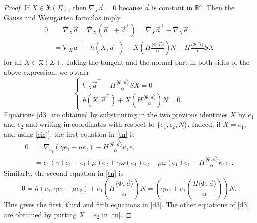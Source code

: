 \documentclass[10pt,a4paper]{amsart}
\def\r{\mathbb R}
\begin{document}
\begin{proof} 
 If $X\in\mathfrak{X}(\Sigma)$, then   $\overline{\nabla}_X\vec{a}=0$ because $\vec{a}$ is constant in $\r^3$. Then the Gauss and
Weingarten formulas imply 
\begin{equation*}
\begin{split}
    0&=\overline{\nabla}_{X}\vec{a}=\overline{\nabla}_{X}(\vec{a}^{\top}+\vec{a}^{\perp})=\overline{\nabla}_X\vec{a}^\top+\overline{\nabla}_X\vec{a}^\perp\\
    &={\nabla}_{X}\vec{a}^{\top}+h(X,\vec{a}^{\top})+X( H\frac{\langle\Phi,\vec{a}\rangle}{\alpha})N- H\frac{\langle \Phi,\vec{a}\rangle}{\alpha} SX 
\end{split}
\end{equation*}
for all   $X\in\mathfrak{X}(\Sigma)$.
Taking the tangent and the normal part in both sides of the above expression, we obtain  
\begin{equation}\label{tn} 
    \left\{
    \begin{array}{ll}
        {\nabla}_{X}\vec{a}^{\top}-H\frac{\langle\Phi,\vec{a}\rangle}{\alpha}SX=0\\
        h(X, \vec{a}^{\top})+X(H\frac{\langle\Phi,\vec{a}\rangle}{\alpha})N=0.
    \end{array}
    \right.
\end{equation}
Equations \eqref{d3} are obtained by substituting  in the two previous identities $X$ by $e_1$ and   $e_2$  and writing in coordinates with respect to $\{e_1,e_2,N\}$. Indeed, if $X=e_1$, and using \eqref{eiej}, the first equation in \eqref{tn} is 
\begin{equation*} 
    \begin{array}{ll}
  0&=  {\nabla}_{e_1}(\gamma e_1+\mu e_2)-H\frac{\langle \Phi,\vec{a}\rangle}{\alpha}\kappa_1 e_1\\
     & =e_1(\gamma)e_1+e_1(\mu)e_2+\gamma \omega(e_1)e_2-\mu\omega(e_1)e_1-H\frac{\langle \Phi,\vec{a}\rangle}{\alpha}\kappa_1 e_1.
         \end{array}
\end{equation*}
Similarly, the second equation in \eqref{tn} is 
$$   0 = h(e_1,\gamma e_1+\mu e_2)+e_1(H\frac{\langle\Phi,\vec{a}\rangle}{\alpha})N =\left(\gamma\kappa_1+e_1\left(\frac{ H\langle\Phi,\vec{a}\rangle}{\alpha}\right)\right)N.$$
This gives the first, third and fifth equations in \eqref{d3}. The other equations of \eqref{d3} are obtained by putting $X=e_2$ in \eqref{tn}.

\end{proof}
\end{document}
